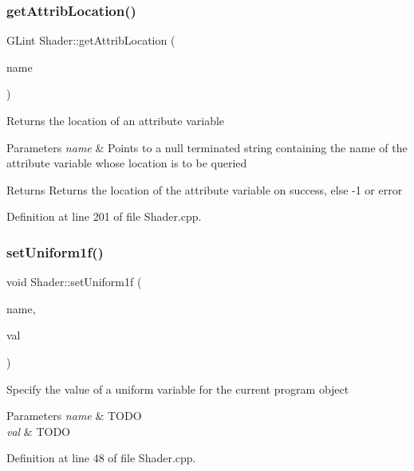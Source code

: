 \subsubsection{\texorpdfstring{get\+Attrib\+Location()}{getAttribLocation()}}
{\footnotesize\ttfamily G\+Lint Shader\+::get\+Attrib\+Location (\begin{DoxyParamCaption}\item[{const char $\ast$}]{name }\end{DoxyParamCaption})}

Returns the location of an attribute variable 
\begin{DoxyParams}{Parameters}
{\em name} & Points to a null terminated string containing the name of the attribute variable whose location is to be queried \\
\hline
\end{DoxyParams}
\begin{DoxyReturn}{Returns}
Returns the location of the attribute variable on success, else -\/1 or error 
\end{DoxyReturn}


Definition at line 201 of file Shader.\+cpp.

\mbox{\label{class_shader_af496d61361a0bde57ccb34e2d5933c43}} 
\subsubsection{\texorpdfstring{set\+Uniform1f()}{setUniform1f()}}
{\footnotesize\ttfamily void Shader\+::set\+Uniform1f (\begin{DoxyParamCaption}\item[{const G\+Lchar $\ast$}]{name,  }\item[{const float}]{val }\end{DoxyParamCaption})}

Specify the value of a uniform variable for the current program object 
\begin{DoxyParams}{Parameters}
{\em name} & T\+O\+DO \\
\hline
{\em val} & T\+O\+DO \\
\hline
\end{DoxyParams}


Definition at line 48 of file Shader.\+cpp.

\mbox{\label{class_shader_a9e34828e84023305a0a9454b20ebae8e}} 
